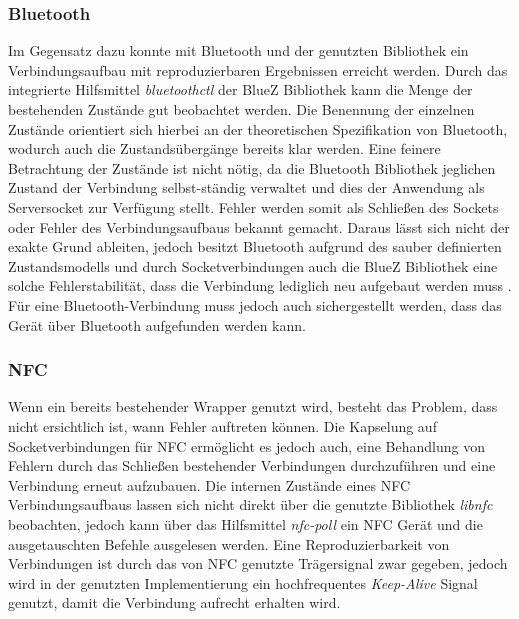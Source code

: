 		\subsubsection{Bluetooth} Im Gegensatz dazu konnte mit Bluetooth und der genutzten Bibliothek ein \linebreak Verbindungsaufbau mit reproduzierbaren Ergebnissen erreicht werden. Durch das integrierte Hilfsmittel {\it bluetoothctl} der BlueZ Bibliothek kann die Menge der bestehenden Zustände gut beobachtet werden. Die Benennung der einzelnen Zustände orientiert sich hierbei an der theoretischen Spezifikation von Bluetooth, wodurch auch die Zustandsübergänge bereits klar werden. Eine feinere Betrachtung der Zustände ist nicht nötig, da die Bluetooth Bibliothek jeglichen Zustand der Verbindung selbst-ständig verwaltet und dies der Anwendung als Serversocket zur Verfügung stellt. Fehler werden somit als Schließen des Sockets oder Fehler des Verbindungsaufbaus bekannt gemacht. Daraus lässt sich nicht der exakte Grund ableiten, jedoch besitzt Bluetooth aufgrund des sauber definierten Zustandsmodells und durch Socketverbindungen auch die BlueZ Bibliothek eine solche Fehlerstabilität, dass die Verbindung lediglich neu aufgebaut werden muss \cite{bluetoothSpec}. Für eine Bluetooth-Verbindung muss jedoch auch  sichergestellt werden, dass das Gerät über Bluetooth aufgefunden werden kann.
		
          \subsubsection{NFC} Wenn ein bereits bestehender Wrapper genutzt wird, besteht das Problem, dass nicht ersichtlich ist, wann Fehler auftreten können. Die Kapselung auf Socketverbindungen für NFC ermöglicht es jedoch auch, eine Behandlung von Fehlern durch das Schließen bestehender Verbindungen durchzuführen und eine Verbindung erneut aufzubauen. Die internen Zustände eines NFC Verbindungsaufbaus lassen sich nicht direkt über die genutzte Bibliothek {\it libnfc} beobachten, jedoch kann über das Hilfsmittel {\it nfc-poll} ein NFC Gerät und die ausgetauschten Befehle ausgelesen werden. Eine Reproduzierbarkeit von Verbindungen ist durch das von NFC genutzte Trägersignal zwar gegeben, jedoch wird in der genutzten Implementierung ein hochfrequentes {\it Keep-Alive} Signal genutzt, damit die Verbindung aufrecht erhalten wird.
     
